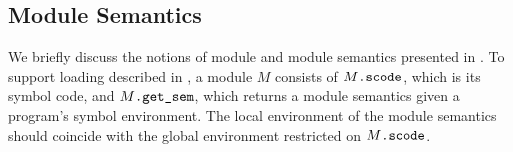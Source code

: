 










\subsection{Module Semantics}
\label{sec:main-semantics:module}


We briefly discuss the notions of module and module semantics presented in .
%
To support loading described in ,
a module $M$ consists of $M\texttt{.scode}$, which is its symbol
code, and $M\texttt{.get\_sem}$, which returns a module semantics given a program's symbol environment.
The local environment  of the module semantics should coincide with the
global environment restricted on $M\texttt{.scode}$.

